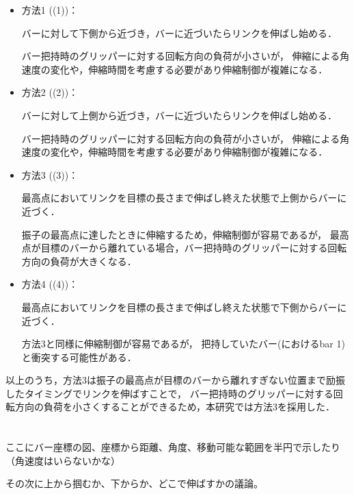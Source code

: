         \begin{itemize}
        \item 方法1 ((1))：
        
        バーに対して下側から近づき，バーに近づいたらリンクを伸ばし始める．

        バー把持時のグリッパーに対する回転方向の負荷が小さいが，
        伸縮による角速度の変化や，伸縮時間を考慮する必要があり伸縮制御が複雑になる．
        
        \item 方法2 ((2))：
        
        バーに対して上側から近づき，バーに近づいたらリンクを伸ばし始める．
        
        バー把持時のグリッパーに対する回転方向の負荷が小さいが，
        伸縮による角速度の変化や，伸縮時間を考慮する必要があり伸縮制御が複雑になる．

        \item 方法3 ((3))：
        
        最高点においてリンクを目標の長さまで伸ばし終えた状態で上側からバーに近づく．
        
        振子の最高点に達したときに伸縮するため，伸縮制御が容易であるが，
        最高点が目標のバーから離れている場合，バー把持時のグリッパーに対する回転方向の負荷が大きくなる．
        
        \item 方法4 ((4))：
        
        最高点においてリンクを目標の長さまで伸ばし終えた状態で下側からバーに近づく．

        方法3と同様に伸縮制御が容易であるが，
        把持していたバー(におけるbar 1)と衝突する可能性がある．

        \end{itemize}

        以上のうち，方法3は振子の最高点が目標のバーから離れすぎない位置まで励振したタイミングでリンクを伸ばすことで，
        バー把持時のグリッパーに対する回転方向の負荷を小さくすることができるため，本研究では方法3を採用した．



        \section{}



        ここにバー座標の図、座標から距離、角度、移動可能な範囲を半円で示したり（角速度はいらないかな）

        その次に上から掴むか、下からか、どこで伸ばすかの議論。



